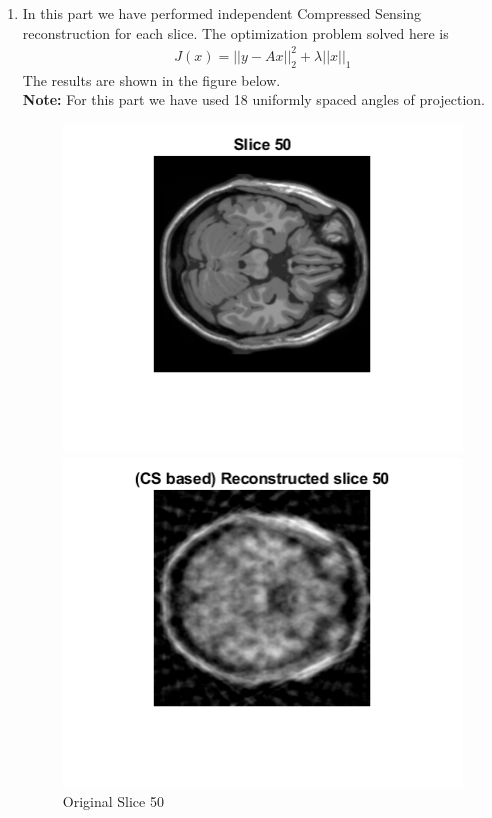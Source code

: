 \documentclass[12pt]{article}
\begin{document}
\begin{enumerate}[label = (\alph*)]
    \item In this part we have performed independent Compressed Sensing reconstruction for each slice. The optimization problem solved here is
    \begin{gather*}
        J(x) = || y-Ax ||^2_2 + \lambda ||x||_1
    \end{gather*}
    The results are shown in the figure below. \\
    \textbf{Note:} For this part we have used 18 uniformly spaced angles of projection.
    \begin{figure}[H]
        \centering
        \begin{minipage}{.45\textwidth}
            \centering
            \includegraphics[width=\linewidth]{Images/Q3_50.png}
            \caption*{Original Slice 50}
        \end{minipage}
        \begin{minipage}{.45\textwidth}
            \centering
            \includegraphics[width=\linewidth]{Images/Q3_50_b.png}

\end{minipage}
\end{figure}
\end{enumerate}
\end{document}
